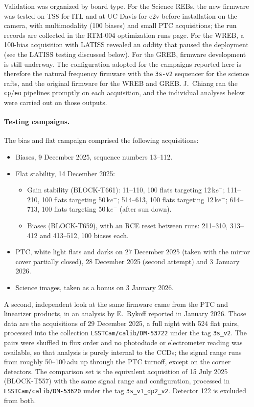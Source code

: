 Validation was organized by board type. For the Science REBs, the new firmware was tested on TS8
for ITL and at UC Davis for e2v before installation on the camera, with multimodality (100 biases)
and small PTC acquisitions; the run records are collected in the RTM-004 optimization runs page.
For the WREB, a 100-bias acquisition with LATISS revealed an oddity that paused the deployment
(see the LATISS testing discussed below). For the GREB, firmware development is still underway.
The configuration adopted for the campaigns reported here is therefore the natural frequency
firmware with the \texttt{3s-v2} sequencer for the science rafts, and the original firmware for
the WREB and GREB. J.~Chiang ran the \texttt{cp}/\texttt{eo} pipelines promptly on each
acquisition, and the individual analyses below were carried out on those outputs.

\paragraph{Testing campaigns.}
The bias and flat campaign comprised the following acquisitions:

\begin{itemize}
    \item Biases, 9 December 2025, sequence numbers 13--112.
    \item Flat stability, 14 December 2025:
    \begin{itemize}
        \item Gain stability (BLOCK-T661): 11--110, 100 flats targeting 12\,k\(e^-\); 111--210,
        100 flats targeting 50\,k\(e^-\); 514--613, 100 flats targeting 12\,k\(e^-\); 614--713,
        100 flats targeting 50\,k\(e^-\) (after sun down).
        \item Biases (BLOCK-T659), with an RCE reset between runs: 211--310, 313--412 and
        413--512, 100 biases each.
    \end{itemize}
    \item PTC, white light flats and darks on 27 December 2025 (taken with the mirror cover
    partially closed), 28 December 2025 (second attempt) and 3 January 2026.
    \item Science images, taken as a bonus on 3 January 2026.
\end{itemize}

A second, independent look at the same firmware came from the PTC and linearizer products, in an
analysis by E.~Rykoff reported in January 2026. Those data are the acquisitions of 29 December
2025, a full night with 524 flat pairs, processed into the collection
\texttt{LSSTCam/calib/DM-53722} under the tag \texttt{3s\_v2}. The pairs were shuffled in flux
order and no photodiode or electrometer reading was available, so that analysis is purely internal
to the CCDs; the signal range runs from roughly 50--100\,adu up through the PTC turnoff, except on
the corner detectors. The comparison set is the equivalent acquisition of 15 July 2025
(BLOCK-T557) with the same signal range and configuration, processed in
\texttt{LSSTCam/calib/DM-53620} under the tag \texttt{3s\_v1\_dp2\_v2}. Detector 122 is excluded
from both.

